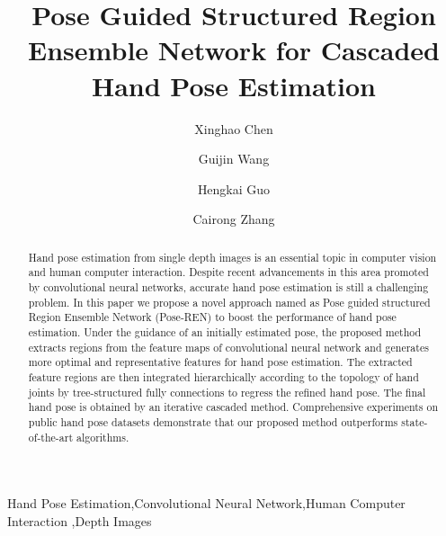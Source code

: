 \documentclass[final, 5p]{elsarticle}
\begin{document}
\begin{frontmatter}

\title{Pose Guided Structured Region Ensemble Network for Cascaded Hand Pose Estimation}

\author[mymainaddress]{Xinghao Chen}

\author[mymainaddress]{Guijin Wang}

\author[secondaddress]{Hengkai Guo}

\author[mymainaddress]{Cairong Zhang}


\address[mymainaddress]{Department of Electronic Engineering, Tsinghua University, Beijing 100084, China}
\address[secondaddress]{AI Lab, Bytedance Inc., Beijing, China}

\begin{abstract}
Hand pose estimation from single depth images is an essential topic in computer vision and human computer interaction. Despite recent advancements in this area promoted by convolutional neural networks, accurate hand pose estimation is still a challenging problem. In this paper we propose a novel approach named as Pose guided structured Region Ensemble Network (Pose-REN) to boost the performance of hand pose estimation. Under the guidance of an initially estimated pose, the proposed method extracts regions from the feature maps of convolutional neural network and generates more optimal and representative features for hand pose estimation. The extracted feature regions are then integrated hierarchically according to the topology of hand joints by tree-structured fully connections to regress the refined hand pose.
The final hand pose is obtained by an iterative cascaded method.
Comprehensive experiments on public hand pose datasets demonstrate that our proposed method outperforms state-of-the-art algorithms.
\end{abstract}

\begin{keyword}
Hand Pose Estimation\sep Convolutional Neural Network\sep Human Computer Interaction \sep Depth Images
\end{keyword}

\end{frontmatter}
\end{document}

